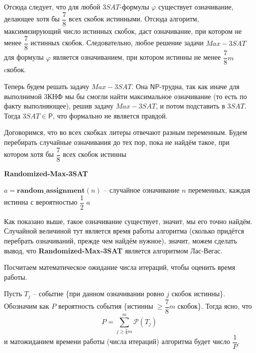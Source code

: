 \documentclass[a4paper,12pt]{article}
\newcommand{\Pclass}{\mathsf{P}}
\newcommand{\NPclass}{\mathsf{NP}}
\renewcommand{\P}{\mathcal{P}}
\begin{document}
Отсюда следует, что для любой $3SAT$-формулы $\varphi$ существует означивание, делающее хотя бы $\dfrac{7}{8}$ всех скобок истинными. Отсюда алгоритм, максимизирующий число истинных скобок, даст означивание, при котором не менее $\dfrac{7}{8}$ истинных скобок. Следовательно, любое решение задачи \(Max-3SAT\)  для формулы $\varphi$ является означиванием, при котором истинны не менее $\dfrac{7}{8}m$ cкобок.

Теперь будем решать задачу \(Max-3SAT\). Она  $\NPclass$-трудна, так как иначе для выполнимой 3КНФ мы бы смогли найти максимальное означивание (то есть по факту выполняющее), решив задачу \(Max-3SAT\), и потом подставить в $3SAT$. Тогда $3SAT \in \Pclass$, что формально не является правдой.

Договоримся, что во всех скобках литеры отвечают разным переменным. Будем перебирать случайные означивания до тех пор, пока не найдём такое, при котором хотя бы $\dfrac{7}{8}$ всех скобок истинны

\begin{algorithm}[H]
    \caption{\textbf{Randomized-Max-3SAT}}
    \begin{algorithmic}[1]
        \Statex
        \Repeat
            \State $a = \textbf{random\_assignment}(n)$ -- случайное означивание $n$ переменных, каждая истинна с вероятностью $\dfrac{1}{2}$
        \State \Return $a$
    \end{algorithmic}
\end{algorithm}


Как показано выше, такое означивание существует, значит, мы его точно найдём. Случайной величиной тут является время работы алгоритма (сколько придётся перебрать означиваний, прежде чем найдём нужное), значит, можем сделать вывод, что  \textbf{Randomized-Max-3SAT} является алгоритмом Лас-Вегас.

Посчитаем математическое ожидание числа итераций, чтобы оценить время работы.

Пусть $T_j$ -- событие \{при данном означивании ровно $j$ скобок истинны\}. Обозначим как $P$ вероятность события \{истинны $\geqslant \dfrac{7}{8}m$ скобок\}. Тогда ясно, что
\[P = \sum\limits_{j \geqslant \frac{7}{8}m}^m \P(T_j)\] и матожиданием времени работы (числа итераций) алгоритма будет число $\dfrac{1}{P}$.
\end{document}
